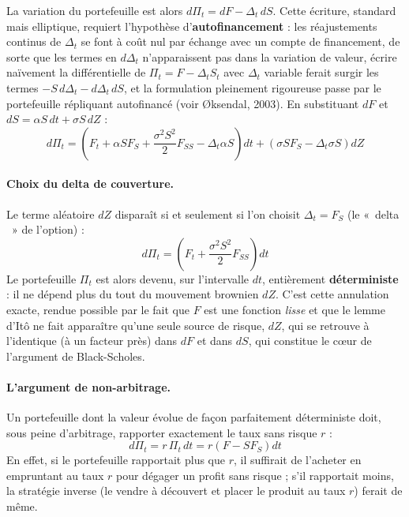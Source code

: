 \documentclass{article}
\providecommand{\og}{«~}
\providecommand{\fg}{~»}
\begin{document}
La variation du portefeuille est alors $d\Pi_t = dF - \Delta_t\, dS$. Cette écriture, standard mais elliptique, requiert l'hypothèse d'\textbf{autofinancement} : les réajustements continus de $\Delta_t$ se font à coût nul par échange avec un compte de financement, de sorte que les termes en $d\Delta_t$ n'apparaissent pas dans la variation de valeur, écrire naïvement la différentielle de $\Pi_t=F-\Delta_t S_t$ avec $\Delta_t$ variable ferait surgir les termes $-S\,d\Delta_t - d\Delta_t\,dS$, et la formulation pleinement rigoureuse passe par le portefeuille répliquant autofinancé (voir Øksendal, 2003). En substituant $dF$ et $dS = \alpha S\,dt+\sigma S\,dZ$ :
\begin{equation}
d\Pi_t = \left(F_t + \alpha S F_S + \frac{\sigma^2 S^2}{2} F_{SS} - \Delta_t \alpha S\right) dt + \left(\sigma S F_S - \Delta_t \sigma S\right) dZ
\end{equation}
\paragraph{Choix du delta de couverture.} Le terme aléatoire $dZ$ disparaît si et seulement si l'on choisit $\Delta_t = F_S$ (le \og delta \fg{} de l'option) :
\begin{equation}
d\Pi_t = \left(F_t + \frac{\sigma^2 S^2}{2} F_{SS}\right) dt
\end{equation}
Le portefeuille $\Pi_t$ est alors devenu, sur l'intervalle $dt$, entièrement \textbf{déterministe} : il ne dépend plus du tout du mouvement brownien $dZ$. C'est cette annulation exacte, rendue possible par le fait que $F$ est une fonction \emph{lisse} et que le lemme d'Itô ne fait apparaître qu'une seule source de risque, $dZ$, qui se retrouve à l'identique (à un facteur près) dans $dF$ et dans $dS$, qui constitue le c\oe ur de l'argument de Black-Scholes.
\paragraph{L'argument de non-arbitrage.} Un portefeuille dont la valeur évolue de façon parfaitement déterministe doit, sous peine d'arbitrage, rapporter exactement le taux sans risque $r$ :
\begin{equation}
d\Pi_t = r\,\Pi_t\, dt = r\left(F - S F_S\right) dt
\end{equation}
En effet, si le portefeuille rapportait plus que $r$, il suffirait de l'acheter en empruntant au taux $r$ pour dégager un profit sans risque ; s'il rapportait moins, la stratégie inverse (le vendre à découvert et placer le produit au taux $r$) ferait de même.
\end{document}
